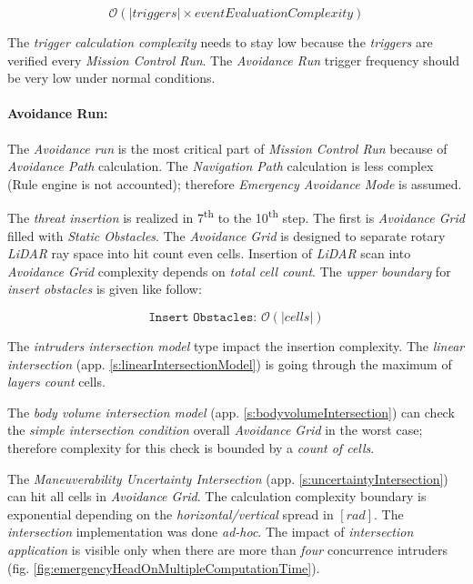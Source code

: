 \begin{equation*}
    \mathscr{O}(|triggers|\times event Evaluation Complexity)    
\end{equation*}

\begin{note} The \emph{trigger calculation complexity} needs to stay low because the \emph{triggers} are verified every \emph{Mission Control Run}. The \emph{Avoidance Run} trigger frequency should be very low under normal conditions.  
\end{note}


\paragraph{Avoidance Run:} The \emph{Avoidance run} is the most critical part of \emph{Mission Control Run} because of \emph{Avoidance Path} calculation. The \emph{Navigation Path} calculation is less complex (Rule engine is not accounted); therefore \emph{Emergency Avoidance Mode} is assumed. 

The \emph{threat insertion} is realized in 7\textsuperscript{th} to the  10\textsuperscript{th} step. The first is \emph{Avoidance Grid} filled with \emph{Static Obstacles}. The \emph{Avoidance Grid} is designed to separate rotary  \emph{LiDAR} ray space into hit count even cells. Insertion of \emph{LiDAR} scan into \emph{Avoidance Grid} complexity depends on \emph{total cell count}. The \emph{upper boundary} for \emph{insert obstacles} is given like follow:

\begin{equation*}
    \texttt{Insert Obstacles: } \mathscr{O}(|cells|)
\end{equation*}

\noindent The \emph{intruders intersection model} type impact the insertion complexity. The \emph{linear intersection} (app. \ref{s:linearIntersectionModel}) is going through the maximum of \emph{layers count} cells. 

The \emph{body volume intersection model} (app. \ref{s:bodyvolumeIntersection}) can check the \emph{simple intersection condition} overall \emph{Avoidance Grid} in the worst case; therefore complexity for this check is bounded by a \emph{count of cells}. 

The \emph{Maneuverability Uncertainty Intersection} (app. \ref{s:uncertaintyIntersection}) can hit all cells in \emph{Avoidance Grid}. The calculation complexity boundary is exponential depending on the \emph{horizontal/vertical} spread in $[rad]$. The \emph{intersection} implementation was done \emph{ad-hoc}. The impact of \emph{intersection application} is visible only when there are more than \emph{four} concurrence intruders (fig. \ref{fig:emergencyHeadOnMultipleComputationTime}).

